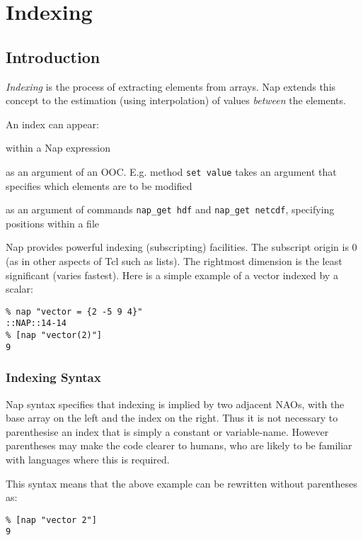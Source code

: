 
\section{Indexing}

\subsection{Introduction}
    \label{indexing-Introduction}

  \emph{Indexing} is the process of extracting elements from arrays.
  Nap extends this concept to the estimation (using interpolation) of
  values 
  \emph{between} the elements.
  
An index can appear:
\begin{bullets}
    \item within a Nap expression
    \item as an argument of an OOC. E.g. method 
	\texttt{set\ value} takes an argument that specifies which elements are to be modified
    \item as an argument of commands \texttt{nap\_get hdf} and 
	\texttt{nap\_get netcdf}, specifying positions within a file
\end{bullets}

Nap provides powerful indexing (subscripting) facilities. The
  subscript origin is 0 (as in other aspects of Tcl such as lists). The
  rightmost dimension is the least significant (varies fastest). Here
  is a simple example of a vector indexed by a scalar:
  \begin{verbatim}
% nap "vector = {2 -5 9 4}"
::NAP::14-14
% [nap "vector(2)"]
9
\end{verbatim}

\subsubsection{Indexing Syntax}
    \label{indexing-Syntax}

Nap syntax specifies that indexing is implied by two adjacent
  NAOs, with the base array on the left and the index on the right.
  Thus it is not necessary to parenthesise an index that is simply a
  constant or variable-name. However parentheses may make the code
  clearer to humans, who are likely to be familiar with languages where
  this is required.
  

This syntax means that the above example can be rewritten without
  parentheses as:
  \begin{verbatim}
% [nap "vector 2"]
9
\end{verbatim}

